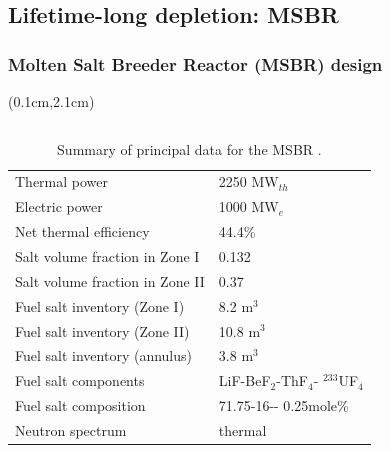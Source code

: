\subsection{Lifetime-long depletion: MSBR}


\begin{frame}
\frametitle{Molten Salt Breeder Reactor (MSBR) design}

\begin{textblock*}{12.5cm}(0.1cm,2.1cm) %
	
	\begin{columns}
		\column[t]{6cm}
		\begin{table}[h!]
			\fontsize{7}{9}\selectfont
			\caption{Summary of principal data for the \gls{MSBR} 
				\cite{robertson_conceptual_1971}. }
			\vspace{-2mm}
			\begin{tabularx}{\textwidth}{ p{3.6cm}  X}
				\hline
				Thermal power				           		& 2250 MW$_{th}$\\ 
				Electric power		                		& 1000 MW$_e$   
				\\  
				Net thermal efficiency        			    & 44.4\%       	
				\\  
				Salt volume fraction in Zone I				& 0.132			\\ 
				Salt volume fraction in Zone II  			& 0.37			\\ 
				Fuel salt inventory (Zone I)				& 8.2 m$^3$     \\
				Fuel salt inventory (Zone II)				& 10.8 m$^3$    \\
				Fuel salt inventory (annulus)				& 3.8 m$^3$     \\
				Fuel salt components    & LiF-BeF$_2$-ThF$_4$-\newline
				$^{233}$UF$_4$\\  
				Fuel salt composition           & 71.75-16-\newline 12-	
				0.25mole\%	\\  
				Neutron spectrum						    & thermal \\
				\hline
			\end{tabularx}
		\end{table}
		

\end{columns}
\end{textblock*}
\end{frame}
